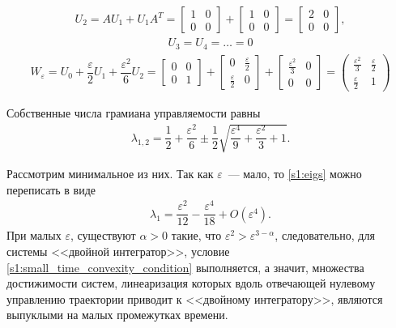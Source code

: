 \documentclass[../main.tex]{subfiles}
\begin{document}
\begin{gather*}
 U_2 = A U_1 + U_1 A^T = \left[ {\begin{array}{*{20}{c}}
 1&0\\
 0&0
 \end{array}}\right] + \left[ {\begin{array}{*{20}{c}}
 1&0\\
 0&0
 \end{array}}\right] = \left[ {\begin{array}{*{20}{c}}
 2&0\\
 0&0
 \end{array}}\right],
\end{gather*}
\begin{gather*}
 U_3 = U_4 = \dots = 0
\end{gather*}
\begin{gather*}
 W_{\varepsilon} = U_0 + \dfrac{\varepsilon}{2} U_1 + \dfrac{\varepsilon^2}{6} U_2 = \left[ {\begin{array}{*{20}{c}}
 0&0\\
 0&1
 \end{array}}\right] + \left[ {\begin{array}{*{20}{c}}
 0&\frac{\varepsilon}{2}\\
 \frac{\varepsilon}{2}&0
 \end{array}}\right] +\left[ {\begin{array}{*{20}{c}}
 \frac{\varepsilon^2}{3}&0\\
 0&0
 \end{array}}\right] = 
 \begin{pmatrix}
 \frac{\varepsilon^2}{3}&\frac{\varepsilon}{2}\\
 \frac{\varepsilon}{2}&1
 \end{pmatrix} 
\end{gather*}
 
Собственные числа грамиана управляемости равны
\begin{gather}\label{s1:eigs}
 \lambda_{1,2} = \dfrac{1}{2}+\dfrac{\varepsilon^2}{6} \pm \dfrac{1}{2}\sqrt{\dfrac{\varepsilon^4}{9} + \dfrac{\varepsilon^2}{3} +1}.
\end{gather}
 
Рассмотрим минимальное из них.
Так как $ \varepsilon $~--- мало, то \eqref{s1:eigs} можно переписать в виде
\begin{gather*}
 \lambda_1 = \dfrac{\varepsilon^2}{12} - \dfrac{\varepsilon^4}{18} + O(\varepsilon^4).
\end{gather*} 
При малых $ \varepsilon $, существуют $\alpha >0 $ такие, что $ \varepsilon^2 > \varepsilon^{3-\alpha} $, следовательно, для системы <<двойной интегратор>>, условие \eqref{s1:small_time_convexity_condition} выполняется, а значит, множества достижимости систем, линеаризация которых вдоль отвечающей нулевому управлению траектории приводит к <<двойному интегратору>>, являются выпуклыми на малых промежутках времени.
\end{document}
